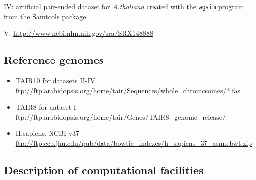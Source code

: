 \documentclass[10pt]{article}
\begin{document}
IV: artificial pair-ended dataset for {\it A.thaliana} created with the {\tt wgsim} program from the Samtools package.

V: \url{http://www.ncbi.nlm.nih.gov/sra/SRX148888}


\subsection*{Reference genomes}
\begin{itemize}
\item TAIR10 for datasets II-IV \url{ftp://ftp.arabidopsis.org/home/tair/Sequences/whole\_chromosomes/*.fas}
\item TAIR8 for dataset I \url{ftp://ftp.arabidopsis.org/home/tair/Genes/TAIR8\_genome\_release/}
\item H.sapiens, NCBI v37 \url{ftp://ftp.ccb.jhu.edu/pub/data/bowtie\_indexes/h\_sapiens\_37\_asm.ebwt.zip}
\end{itemize}

\subsection*{Description of computational facilities}
\end{document}

